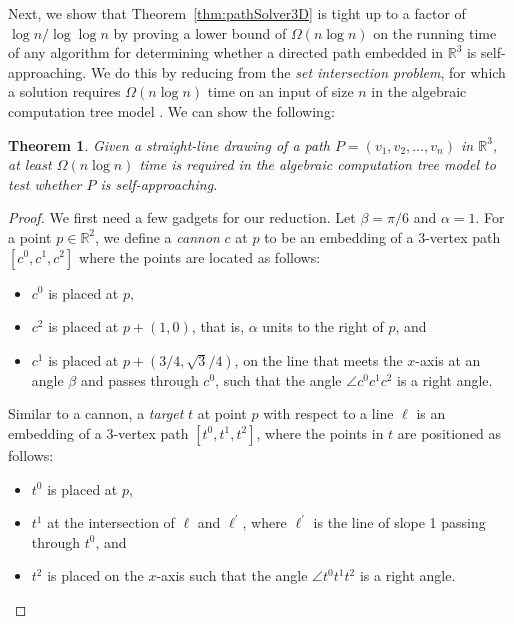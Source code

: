 \documentclass[11pt]{article}
\newtheorem{theorem}{Theorem}
\newcommand{\changedagain}[1]{{#1}}
\begin{document}
Next, we show that Theorem~\ref{thm:pathSolver3D} is tight up to a factor of $\log n/\log\log n$ by proving a lower bound of $\Omega(n \log n)$ on the running time of any algorithm for determining whether a directed path embedded in $\mathbb{R}^3$ is self-approaching.  We do this by reducing from the \emph{set intersection problem}, for which a solution requires $\Omega(n \log n)$ time on an input of size $n$ in the algebraic computation tree model \cite{Ben83}.  We can show the following:
\begin{theorem}
\label{thm:hardnesspath}
Given a straight-line drawing of a path $P=(v_1,v_2,\ldots,v_n)$ in $\mathbb{R}^3$, at least $\Omega(n\log n)$ time is required in the algebraic computation tree model to test whether $P$ is self-approaching.
\end{theorem}
\begin{proof}
We first need a few gadgets for our reduction. Let $\beta = \pi/6$ and $\alpha = 1$.  For a point $p \in \mathbb{R}^2$, we define a \emph{cannon} $c$ at $p$ to be an embedding of a 3-vertex path $[c^0,c^1,c^2]$ where the points are located as follows:
\begin{itemize}
\item $c^0$ is placed at $p$,
\item $c^2$ is placed at $p + (1,0)$, that is, $\alpha$ units to the right of $p$, and
\item $c^1$ is placed at $p + (3/4, \sqrt{3}/4)$, on the line that meets the $x$-axis at an angle $\beta$ and passes through $c^0$, such that the angle
$\angle{c^0c^1c^2}$
is a right angle.
\end{itemize}
Similar to a cannon, a \emph{target} $t$ at point $p$ with respect to \changedagain{a line} $\ell$ is an embedding of a 3-vertex path $[t^0,t^1,t^2]$, where the points in $t$ are positioned as follows:
\begin{itemize}
\item $t^0$ is placed at $p$,
\item $t^1$ at the intersection of $\ell$ and $\ell^\prime$, where $\ell^\prime$ is the line of slope 1 passing through $t^0$, and
\item $t^2$ is placed on the $x$-axis such that the angle
$\angle{t^0t^1t^2}$   is a right angle.
\end{itemize}


\end{proof}
\end{document}
